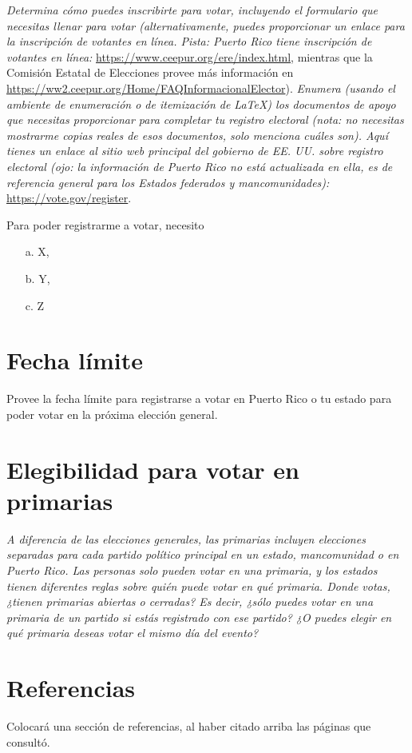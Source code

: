 \documentclass[11pt]{article} %
\begin{document}
\textit{Determina cómo puedes inscribirte para votar, incluyendo el formulario que necesitas llenar para votar (alternativamente, puedes proporcionar un enlace para la inscripción de votantes en línea. Pista: Puerto Rico tiene inscripción de votantes en línea:} \url{https://www.ceepur.org/ere/index.html}, mientras que la Comisión Estatal de Elecciones provee más información en \url{https://ww2.ceepur.org/Home/FAQInformacionalElector}). \textit{Enumera (usando el ambiente de enumeración o de itemización de \LaTeX) los documentos de apoyo que necesitas proporcionar para completar tu registro electoral (nota: no necesitas mostrarme copias reales de esos documentos, solo menciona cuáles son). Aquí tienes un enlace al sitio web principal del gobierno de EE. UU. sobre registro electoral (ojo: la información de Puerto Rico no está actualizada en ella, es de referencia general para los Estados federados y mancomunidades):} \url{https://vote.gov/register}.  

Para poder registrarme a votar, necesito 
\begin{itemize}
    \item[a.] X,
    \item[b.] Y,
    \item[c.] Z
\end{itemize}

\section{Fecha límite}

Provee la fecha límite para registrarse a votar en Puerto Rico o tu estado para poder votar en la próxima elección general.

\section{Elegibilidad para votar en primarias}

\textit{A diferencia de las elecciones generales, las primarias incluyen elecciones separadas para cada partido político principal en un estado, mancomunidad o en Puerto Rico. Las personas solo pueden votar en una primaria, y los estados tienen diferentes reglas sobre quién puede votar en qué primaria. Donde votas, ¿tienen primarias abiertas o cerradas? Es decir, ¿sólo puedes votar en una primaria de un partido si estás registrado con ese partido? ¿O puedes elegir en qué primaria deseas votar el mismo día del evento?}

\section*{Referencias}

Colocará una sección de referencias, al haber citado arriba las páginas que consultó. 
\end{document}
